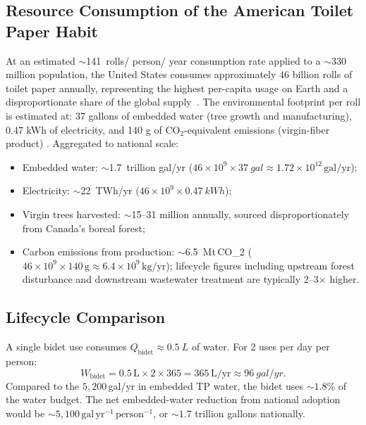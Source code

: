 \documentclass[10pt,letterpaper]{article}
\begin{document}
\subsection{Resource Consumption of the American Toilet Paper Habit}

At an estimated $\sim$141~rolls/ person/ year consumption rate
applied to a $\sim 330$ million population, the United States consumes
approximately $46$ billion rolls of toilet paper annually, representing
the highest per-capita usage on Earth and a disproportionate share of
the global supply~\citep{ScientificAmerican2009}. The environmental
footprint per roll is estimated at: 37 gallons of embedded water (tree
growth and manufacturing), 0.47 kWh of electricity, and 140 g of
CO$_2$-equivalent emissions (virgin-fiber product) \citep{NRDC2020}.
Aggregated to national scale:
\begin{itemize}[leftmargin=*]
    \item Embedded water: $\sim$1.7~trillion gal/yr
    ($46 \times 10^9 \times 37~gal \approx
    1.72 \times 10^{12}\,\mathrm{gal/yr}$);
    \item Electricity: $\sim$22~TWh/yr
    ($46 \times 10^9 \times 0.47~kWh$);
    \item Virgin trees harvested: $\sim$15--31 million annually, sourced
    disproportionately from Canada's boreal forest;
    \item Carbon emissions from production:
    $\sim$6.5~Mt\,CO_2
    ($46 \times 10^9 \times 140\,\mathrm{g} \approx
    6.4 \times 10^9\,\mathrm{kg/yr}$); lifecycle figures including
    upstream forest disturbance and downstream wastewater treatment
    are typically 2--3$\times$ higher.
\end{itemize}

\subsection{Lifecycle Comparison}

A single bidet use consumes $Q_\mathrm{bidet} \approx 0.5~L$ of water.
For 2 uses per day per person:
\begin{equation}
    W_\mathrm{bidet} = 0.5\,\mathrm{L} \times 2 \times 365 = 365\,\mathrm{L/yr}
    \approx 96~gal/yr.
\end{equation}
Compared to the $5{,}200$\,gal/yr in embedded TP water, the bidet uses
$\sim\!1.8\%$ of the water budget. The net embedded-water reduction from
national adoption would be $\sim\!5{,}100\,\mathrm{gal\,yr^{-1}\,person^{-1}}$,
or $\sim\!1.7$ trillion gallons nationally.
\end{document}
